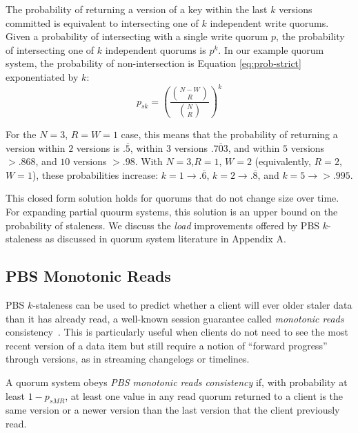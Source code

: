 \documentclass{vldb}
\newcommand{\subsectionskip}{-0em}
\begin{document}
The probability of returning a version of a key within the last $k$
versions committed is equivalent to intersecting one of $k$
independent write quorums.  Given a probability of intersecting with a
single write quorum $p$, the probability of intersecting one of $k$
independent quorums is $p^k$.  In our example quorum system, the
probability of non-intersection is Equation \ref{eq:prob-strict}
exponentiated by $k$:
\begin{equation}
\label{eq:k-consistency}
p_{sk} = \left(\frac{{N-W \choose R}}{{N \choose R}}\right)^k
\end{equation}

For the $N$$=$$3$, $R$$=$$W$$=$$1$ case, this means that the
probability of returning a version within $2$ versions is
$.\overline{5}$, within $3$ versions $.\overline{703}$, and within $5$
versions $> .868$, and $10$ versions $>.98$.  With
$N$$=$$3$,$R$$=$$1$, $W$$=$$2$ (equivalently, $R$$=$$2$, $W$$=$$1$),
these probabilities increase: $k$$=$$1 \rightarrow .\overline{6}$, $k$$=$$2
\rightarrow .\overline{8}$, and $k$$=$$5 \rightarrow > .995$.

This closed form solution holds for quorums that do not change size
over time.  For expanding partial quourm systems, this solution is an
upper bound on the probability of staleness.  We discuss the
\textit{load} improvements offered by PBS $k$-staleness as discussed
in quorum system literature in Appendix A.

\vspace{\subsectionskip}\subsection{PBS Monotonic Reads}

PBS $k$-staleness can be used to predict whether a client will ever
older staler data than it has already read, a well-known session
guarantee called \textit{monotonic reads}
consistency~\cite{sessionguarantees}.  This is particularly useful
when clients do not need to see the most recent version of a data item
but still require a notion of ``forward progress'' through versions,
as in streaming changelogs or timelines.

\begin{definition}
\label{def:prob-mr}
A quorum system obeys \textit{PBS monotonic reads consistency} if,
with probability at least $1-p_{sMR}$, at least one value in any
read quorum returned to a client is the same version or a newer
version than the last version that the client previously read.
\end{definition}
\end{document}
